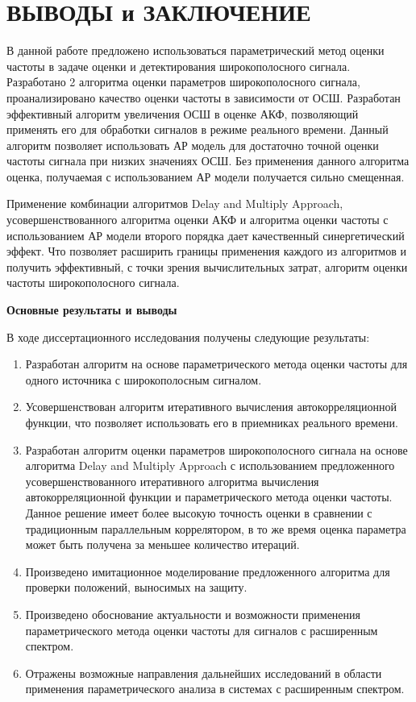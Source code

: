 \section*{ВЫВОДЫ и ЗАКЛЮЧЕНИЕ}

В данной работе предложено использоваться параметрический метод оценки частоты в задаче оценки и детектирования широкополосного сигнала. Разработано 2 алгоритма
оценки параметров широкополосного сигнала, проанализировано качество оценки частоты в зависимости от ОСШ. Разработан эффективный алгоритм
увеличения ОСШ в оценке АКФ, позволяющий применять его для обработки сигналов в режиме реального времени.
Данный алгоритм позволяет использовать АР модель для достаточно точной оценки частоты сигнала при низких значениях ОСШ. Без применения данного алгоритма
оценка, получаемая с использованием АР модели получается сильно смещенная.

Применение комбинации алгоритмов Delay and Multiply Approach, усовершенствованного
алгоритма оценки АКФ и алгоритма оценки частоты с использованием АР модели второго порядка дает качественный синергетический эффект. Что позволяет
расширить границы применения каждого из алгоритмов и получить эффективный, с точки зрения вычислительных затрат, алгоритм оценки частоты широкополосного сигнала.

\noindent\centerline{\bf{Основные результаты и выводы}}
В ходе диссертационного исследования получены следующие результаты:
\begin{enumerate}
\item Разработан алгоритм на основе параметрического метода оценки частоты для одного источника с широкополосным сигналом.
\item Усовершенствован алгоритм итеративного вычисления автокорреляционной функции, что позволяет использовать его в приемниках
	реального времени.
\item Разработан алгоритм оценки параметров широкополосного сигнала на основе алгоритма Delay and Multiply Approach с использованием
	предложенного усовершенствованного итеративного алгоритма вычисления автокорреляционной функции и параметрического
	метода оценки частоты. Данное решение имеет более высокую точность оценки в сравнении с традиционным
	параллельным коррелятором, в то же время оценка параметра может быть получена за меньшее количество итераций.
\item Произведено имитационное моделирование предложенного алгоритма для проверки положений, выносимых на защиту.
\item Произведено обоснование актуальности и возможности применения параметрического метода оценки частоты для сигналов
	с расширенным спектром.
\item Отражены возможные направления дальнейших исследований в области применения параметрического анализа в системах
	с расширенным спектром.
\end{enumerate}

